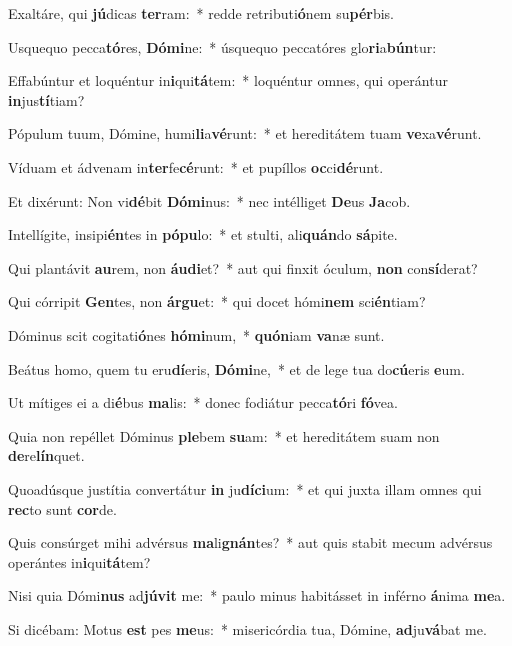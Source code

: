\item Exaltáre, qui \textbf{jú}dicas \textbf{ter}ram:~* redde retributi\textbf{ó}nem su\textbf{pér}bis.
\item Usquequo pecca\textbf{tó}res, \textbf{Dó}\textbf{mi}ne:~* úsquequo peccatóres glo\textbf{ri}a\textbf{bún}tur:
\item Effabúntur et loquéntur in\textbf{i}qui\textbf{tá}tem:~* loquéntur omnes, qui operántur \textbf{in}jus\textbf{tí}tiam?
\item Pópulum tuum, Dómine, humi\textbf{li}a\textbf{vé}runt:~* et hereditátem tuam \textbf{ve}xa\textbf{vé}runt.
\item Víduam et ádvenam in\textbf{ter}fe\textbf{cé}runt:~* et pupíllos \textbf{oc}ci\textbf{dé}runt.
\item Et dixérunt: Non vi\textbf{dé}bit \textbf{Dó}\textbf{mi}nus:~* nec intélliget \textbf{De}us \textbf{Ja}cob.
\item Intellígite, insipi\textbf{én}tes in \textbf{pó}\textbf{pu}lo:~* et stulti, ali\textbf{quán}do \textbf{sá}pite.
\item Qui plantávit \textbf{au}rem, non \textbf{áu}\textbf{di}et?~* aut qui finxit óculum, \textbf{non} con\textbf{sí}derat?
\item Qui córripit \textbf{Gen}tes, non \textbf{ár}\textbf{gu}et:~* qui docet hómi\textbf{nem} sci\textbf{én}tiam?
\item Dóminus scit cogitati\textbf{ó}nes \textbf{hó}\textbf{mi}num,~* \textbf{quón}iam \textbf{va}næ sunt.
\item Beátus homo, quem tu eru\textbf{dí}eris, \textbf{Dó}\textbf{mi}ne,~* et de lege tua do\textbf{cú}eris \textbf{e}um.
\item Ut mítiges ei a di\textbf{é}bus \textbf{ma}lis:~* donec fodiátur pecca\textbf{tó}ri \textbf{fó}vea.
\item Quia non repéllet Dóminus \textbf{ple}bem \textbf{su}am:~* et hereditátem suam non \textbf{de}re\textbf{lín}quet.
\item Quoadúsque justítia convertátur \textbf{in} ju\textbf{dí}\textbf{ci}um:~* et qui juxta illam omnes qui \textbf{rec}to sunt \textbf{cor}de.
\item Quis consúrget mihi advérsus \textbf{ma}li\textbf{gnán}tes?~* aut quis stabit mecum advérsus operántes in\textbf{i}qui\textbf{tá}tem?
\item Nisi quia Dómi\textbf{nus} ad\textbf{jú}\textbf{vit} me:~* paulo minus habitásset in inférno \textbf{á}nima \textbf{me}a.
\item Si dicébam: Motus \textbf{est} pes \textbf{me}us:~* misericórdia tua, Dómine, \textbf{ad}ju\textbf{vá}bat me.
